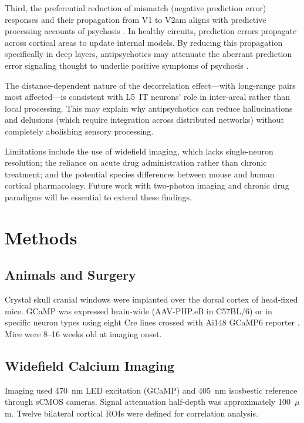 \documentclass[11pt]{article}
\begin{document}
Third, the preferential reduction of mismatch (negative prediction error) responses and their propagation from V1 to V2am aligns with predictive processing accounts of psychosis \citep{sterzer2018predictive, adams2013computational}. In healthy circuits, prediction errors propagate across cortical areas to update internal models. By reducing this propagation specifically in deep layers, antipsychotics may attenuate the aberrant prediction error signaling thought to underlie positive symptoms of psychosis \citep{fletcher2009perceiving}.

The distance-dependent nature of the decorrelation effect---with long-range pairs most affected---is consistent with L5~IT neurons' role in inter-areal rather than local processing. This may explain why antipsychotics can reduce hallucinations and delusions (which require integration across distributed networks) without completely abolishing sensory processing.

Limitations include the use of widefield imaging, which lacks single-neuron resolution; the reliance on acute drug administration rather than chronic treatment; and the potential species differences between mouse and human cortical pharmacology. Future work with two-photon imaging and chronic drug paradigms will be essential to extend these findings.

\section{Methods}

\subsection{Animals and Surgery}

Crystal skull cranial windows were implanted over the dorsal cortex of head-fixed mice. GCaMP was expressed brain-wide (AAV-PHP.eB in C57BL/6) or in specific neuron types using eight Cre lines crossed with Ai148 GCaMP6 reporter \citep{chen2013ultrasensitive}. Mice were 8--16 weeks old at imaging onset.

\subsection{Widefield Calcium Imaging}

Imaging used 470~nm LED excitation (GCaMP) and 405~nm isosbestic reference through sCMOS cameras. Signal attenuation half-depth was approximately 100~$\mu$m. Twelve bilateral cortical ROIs were defined for correlation analysis.
\end{document}
